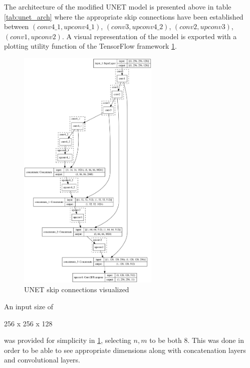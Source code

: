\documentclass[a4paper,12pt]{article}
\begin{document}
\vspace{4mm}

\par The architecture of the modified UNET model is presented above in table \ref{tab:unet_arch} where the appropriate skip connections have been established between $(conv4\_1, upconv4\_1)$, $(conv3, upconv4\_2)$, $(conv2, upconv3)$, $(conv1, upconv2)$. A visual representation of the model is exported with a plotting utility function of the TensorFlow framework \ref{fig:unet_skip_vis}.

\vspace{4mm}

\begin{figure}[H]
    \centering
    \includegraphics[width=0.6\textwidth]{model.png}
    \caption{UNET skip connections visualized}
    \label{fig:unet_skip_vis}
\end{figure}

\vspace{4mm}

\par An input size of  \begin{markdown}
256 x 256 x 128
\end{markdown}
was provided for simplicity in \ref{fig:unet_skip_vis}, selecting $n, m$ to be both $8$. This was done in order to be able to see appropriate dimensions along with concatenation layers and convolutional layers. 
\end{document}
